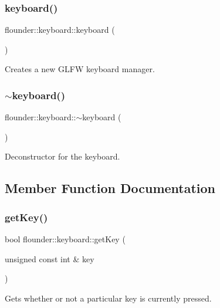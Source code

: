 \subsubsection{\texorpdfstring{keyboard()}{keyboard()}}
{\footnotesize\ttfamily flounder\+::keyboard\+::keyboard (\begin{DoxyParamCaption}{ }\end{DoxyParamCaption})}



Creates a new G\+L\+FW keyboard manager. 

\mbox{\label{classflounder_1_1keyboard_a7af3194a3ee06eb4e58b9a9adf5a6e52}} 
\subsubsection{\texorpdfstring{$\sim$keyboard()}{~keyboard()}}
{\footnotesize\ttfamily flounder\+::keyboard\+::$\sim$keyboard (\begin{DoxyParamCaption}{ }\end{DoxyParamCaption})}



Deconstructor for the keyboard. 



\subsection{Member Function Documentation}
\mbox{\label{classflounder_1_1keyboard_a26448bc1e44c9bfa9af882d53e599721}} 
\subsubsection{\texorpdfstring{get\+Key()}{getKey()}}
{\footnotesize\ttfamily bool flounder\+::keyboard\+::get\+Key (\begin{DoxyParamCaption}\item[{unsigned const int \&}]{key }\end{DoxyParamCaption})}



Gets whether or not a particular key is currently pressed. 

